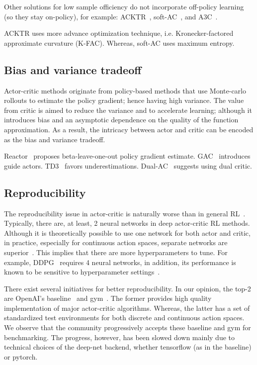 Other solutions for low sample officiency do not incorporate off-policy learning
(so they stay on-policy), for example: ACKTR~\cite{}, soft-AC~\cite{}, and A3C~\cite{}.

ACKTR uses more advance optimization technique, i.e. Kronecker-factored approximate curvature (K-FAC).
Whereas, soft-AC uses maximum entropy.

\subsection{Bias and variance tradeoff}
Actor-critic methods originate from policy-based methods that
use Monte-carlo rollouts to estimate the policy gradient; hence having high variance.
The value from critic is aimed to reduce the variance and to accelerate learning;
although it introduces bias and an asymptotic dependence on the quality of the function approximation.
As a result, the intricacy between actor and critic can be encoded as the bias and variance tradeoff.

Reactor~\cite{} proposes beta-leave-one-out policy gradient estimate.
GAC~\cite{} introduces guide actors.
TD3~\cite{} favors underestimations.
Dual-AC~\cite{} suggests using dual critic.

\subsection{Reproducibility}
The reproducibility issue in actor-critic is naturally worse than in general RL~\cite{}.
Typically, there are, at least, 2 neural networks in deep actor-critic RL methods.
Although it is theoretically possible to use one network for both actor and critic,
in practice, especially for continuous action spaces, separate networks are superior~\cite{A3c}.
This implies that there are more hyperparameters to tune.
For example, DDPG~\cite{} requires 4 neural networks, in addition,
its performance is known to be sensitive to hyperparameter settings~\cite{}.

There exist several initiatives for better reproducibility.
In our opinion, the top-2 are OpenAI's baseline~\cite{} and gym~\cite{}.
The former provides high quality implementation of major actor-critic algorithms.
Whereas, the latter has a set of standardized test environments for both discrete and continuous action spaces.
We observe that the community progressively accepts these baseline and gym for benchmarking.
The progress, however, has been slowed down mainly due to technical choices of the deep-net backend,
whether tensorflow (as in the baseline) or pytorch.

